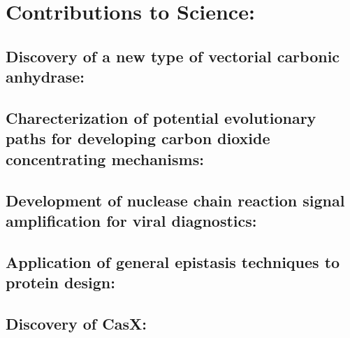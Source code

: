 \documentclass{article}
\begin{document}
\section*{Contributions to Science:}
\newrefsection
\subsection{Discovery of a new type of vectorial carbonic anhydrase:}

%
\nocite{Desmarais2019-yc}
\printbibliography

\newrefsection
\subsection{Charecterization of potential evolutionary paths for developing carbon dioxide concentrating mechanisms:}

%
\nocite{Flamholz2022-yo}
\printbibliography

\newrefsection
\subsection{Development of nuclease chain reaction signal amplification for viral diagnostics:}

%
\nocite{Liu2021-pu}
\printbibliography

\subsection{Application of general epistasis techniques to protein design:}


\newrefsection
\subsection{Discovery of CasX:}

%
\nocite{Liu2019-mk}
\printbibliography
\end{document}
